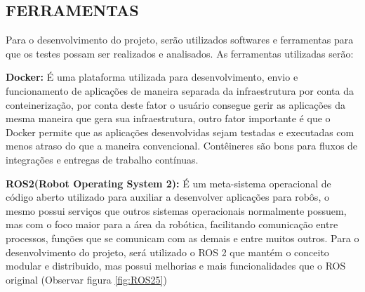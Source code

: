 
\subsection{FERRAMENTAS}
Para o desenvolvimento do projeto, serão utilizados softwares e ferramentas para que os testes possam ser realizados e analisados. As ferramentas utilizadas serão:

\textbf{Docker:} É uma plataforma utilizada para desenvolvimento, envio e funcionamento de aplicações de maneira separada da infraestrutura por conta da conteinerização, por conta deste fator o usuário consegue gerir as aplicações da mesma maneira que gera sua infraestrutura, outro fator importante é que o Docker permite que as aplicações desenvolvidas sejam testadas e executadas com menos atraso do que a maneira convencional. Contêineres são bons para fluxos de integrações e entregas de trabalho contínuas.\cite{dck2025}

\textbf{ROS2(Robot Operating System 2):} É um meta-sistema operacional de código aberto utilizado para auxiliar a desenvolver aplicações para robôs, o mesmo possui serviços que outros sistemas operacionais normalmente possuem, mas com o foco maior para a área da robótica, facilitando comunicação entre processos, funções que se comunicam com as demais e entre muitos outros. Para o desenvolvimento do projeto, será utilizado o ROS 2 que mantém o conceito modular e distribuido, mas possui melhorias e mais funcionalidades que o ROS original (Observar figura \ref{fig:ROS25}) \cite{ros2025}

